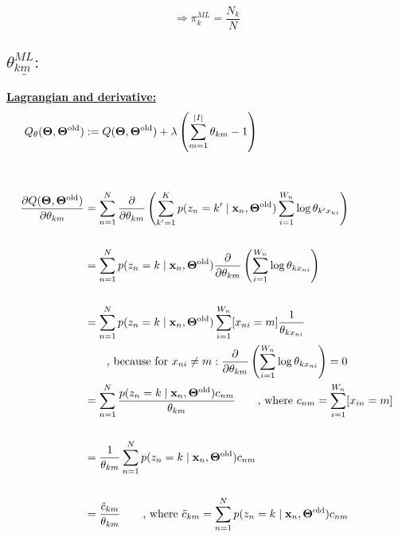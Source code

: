 \begin{enumerate}
   
   \[\Rightarrow \pi_k^{ML} = \frac{N_k}{N}\]
   
   \subsection*{$\underline{\theta_{km}^{ML}:}$}
   \underline{\textbf{Lagrangian and derivative:}}
   \begin{align*}
      Q_\theta(\bold{\Theta}, \bold{\Theta}^{\text{old}}) &:= Q(\bold{\Theta}, \bold{\Theta}^{\text{old}}) + \lambda \left(\sum_{m=1}^{\vert I \vert} \theta_{km} - 1\right) \\
      & \\
      & \\
      \frac{\partial Q(\bold{\Theta}, \bold{\Theta}^{\text{old}})}{\partial \theta_{km}} &= \sum_{n=1}^N \frac{\partial}{\partial \theta_{km}} \left(\sum_{k'=1}^K p(z_n = k' \mid \bold{x}_n, \bold{\Theta}^{\text{old}}) \sum_{i=1}^{W_n}\log \theta_{k'x_{ni}}\right) \\ 
      & \\
      &= \sum_{n=1}^N p(z_n = k \mid \bold{x}_n, \bold{\Theta}^{\text{old}}) \frac{\partial}{\partial \theta_{km}} \left( \sum_{i=1}^{W_n}\log \theta_{kx_{ni}}\right) \\ 
      &\\
      &= \sum_{n=1}^N p(z_n = k \mid \bold{x}_n, \bold{\Theta}^{\text{old}}) \sum_{i=1}^{W_n}[x_{ni} = m]\frac{1}{\theta_{kx_{ni}}}\\
      & \qquad \text{, because for } x_{ni} \neq m:\frac{\partial}{\partial \theta_{km}} \left( \sum_{i=1}^{W_n}\log \theta_{kx_{ni}}\right) = 0\\
      &= \sum_{n=1}^N \frac{p(z_n = k \mid \bold{x}_n, \bold{\Theta}^{\text{old}}) c_{nm}}{\theta_{km}}\qquad\text{, where } c_{nm} = \sum_{i=1}^{W_n} [x_{in} = m]\\ 
      & \\
      &= \frac{1}{\theta_{km}} \sum_{n=1}^N p(z_n = k \mid \bold{x}_n, \bold{\Theta}^{\text{old}}) c_{nm} \\
      & \\
      &= \frac{\tilde{c}_{km}}{\theta_{km}} \qquad \text{, where } \tilde{c}_{km} = \sum_{n=1}^N p(z_n = k \mid \bold{x}_n, \bold{\Theta}^{\text{old}})c_{nm} 
   \end{align*}  
    

\end{enumerate}
